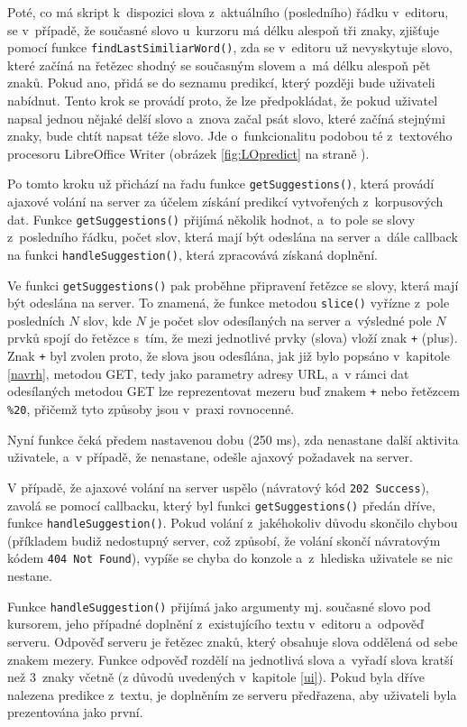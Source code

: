 \documentclass[a4paper,11pt,openany]{book} %
\begin{document}
Poté, co má skript k~dispozici slova z~aktuálního (posledního) řádku v~editoru, se v~případě, že současné slovo u~kurzoru má délku alespoň tři znaky, zjišťuje pomocí funkce {\tt findLastSimiliarWord()}, zda se v~editoru už nevyskytuje slovo, které začíná na řetězec shodný se současným slovem a~má délku alespoň pět znaků. Pokud ano, přidá se do seznamu predikcí, který později bude uživateli nabídnut. Tento krok se provádí proto, že lze předpokládat, že pokud uživatel napsal jednou nějaké delší slovo a~znova začal psát slovo, které začíná stejnými znaky, bude chtít napsat téže slovo. Jde o~funkcionalitu podobou té z~textového procesoru LibreOffice Writer (obrázek \ref{fig:LOpredict} na straně \pageref{fig:LOpredict}).

Po tomto kroku už přichází na řadu funkce {\tt getSuggestions()}, která provádí ajaxové volání na server za účelem získání predikcí vytvořených z~korpusových dat. Funkce {\tt getSuggestions()} přijímá několik hodnot, a~to pole se slovy z~posledního řádku, počet slov, která mají být odeslána na server a~dále callback na funkci {\tt handleSuggestion()}, která zpracovává získaná doplnění.

Ve funkci {\tt getSuggestions()} pak proběhne připravení řetězce se slovy, která mají být odeslána na server. To znamená, že funkce metodou {\tt slice()} vyřízne z~pole posledních $N$ slov, kde $N$ je počet slov odesílaných na server a~výsledné pole $N$ prvků spojí do řetězce s~tím, že mezi jednotlivé prvky (slova) vloží znak {\tt +} (plus). Znak {\tt +} byl zvolen proto, že slova jsou odesílána, jak již bylo popsáno v~kapitole \ref{navrh}, metodou GET, tedy jako parametry adresy URL, a~v rámci dat odesílaných metodou GET lze reprezentovat mezeru buď znakem {\tt +} nebo řetězcem {\tt \%20}, přičemž tyto způsoby jsou v~praxi rovnocenné.

Nyní funkce čeká předem nastavenou dobu (250 ms), zda nenastane další aktivita uživatele, a~v případě, že nenastane, odešle ajaxový požadavek na server.

V případě, že ajaxové volání na server uspělo (návratový kód {\tt 202 Success}), zavolá se pomocí callbacku, který byl funkci {\tt getSuggestions()} předán dříve, funkce {\tt handleSuggestion()}. Pokud volání z~jakéhokoliv důvodu skončilo chybou (příkladem budiž nedostupný server, což způsobí, že volání skončí návratovým kódem {\tt 404 Not Found}), vypíše se chyba do konzole a~z~hlediska uživatele se nic nestane. 

Funkce {\tt handleSuggestion()} přijímá jako argumenty mj. současné slovo pod kursorem, jeho případné doplnění z~existujícího textu v~editoru a~odpověď serveru. Odpověď serveru je řetězec znaků, který obsahuje slova oddělená od sebe znakem mezery. Funkce odpověď rozdělí na jednotlivá slova a~vyřadí slova kratší než 3~znaky včetně (z důvodů uvedených v~kapitole \ref{ui}). Pokud byla dříve nalezena predikce z~textu, je doplněním ze serveru předřazena, aby uživateli byla prezentována jako první.
\end{document}
